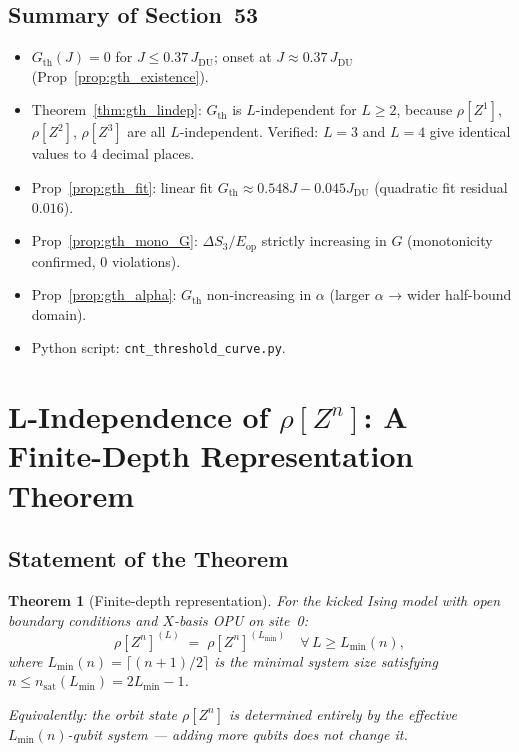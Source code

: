 \documentclass[12pt,a4paper]{article}
\newtheorem{theorem}{Theorem}[section]
\begin{document}
\subsection*{Summary of Section~53}
\begin{itemize}
\item $G_\mathrm{th}(J)=0$ for $J\leq0.37\,J_\mathrm{DU}$; onset at $J\approx0.37\,J_\mathrm{DU}$ (Prop~\ref{prop:gth_existence}).
\item Theorem~\ref{thm:gth_lindep}: $G_\mathrm{th}$ is $L$-independent for $L\geq2$,
  because $\rho[Z^1]$, $\rho[Z^2]$, $\rho[Z^3]$ are all $L$-independent.
  Verified: $L=3$ and $L=4$ give identical values to 4 decimal places.
\item Prop~\ref{prop:gth_fit}: linear fit $G_\mathrm{th}\approx0.548J-0.045J_\mathrm{DU}$
  (quadratic fit residual $0.016$).
\item Prop~\ref{prop:gth_mono_G}: $\Delta S_3/E_\mathrm{op}$ strictly increasing in $G$
  (monotonicity confirmed, 0 violations).
\item Prop~\ref{prop:gth_alpha}: $G_\mathrm{th}$ non-increasing in $\alpha$ (larger $\alpha$
  → wider half-bound domain).
\item Python script: \texttt{cnt\_threshold\_curve.py}.
\end{itemize}

\section{L-Independence of $\rho[Z^n]$: A Finite-Depth Representation Theorem}
\label{sec:lindep_n3}

\subsection{Statement of the Theorem}
\label{subsec:lindep_statement}

\begin{theorem}[Finite-depth representation]\label{thm:finite_depth}
For the kicked Ising model with open boundary conditions and $X$-basis OPU on site~0:
\[
  \rho[Z^n]^{(L)} \;=\; \rho[Z^n]^{(L_\mathrm{min})}
  \quad\forall\, L\geq L_\mathrm{min}(n),
\]
where $L_\mathrm{min}(n)=\lceil(n+1)/2\rceil$ is the minimal system size satisfying
$n\leq n_\mathrm{sat}(L_\mathrm{min})=2L_\mathrm{min}-1$.

Equivalently: the orbit state $\rho[Z^n]$ is determined entirely by the effective
$L_\mathrm{min}(n)$-qubit system — adding more qubits does not change it.
\end{theorem}
\end{document}

